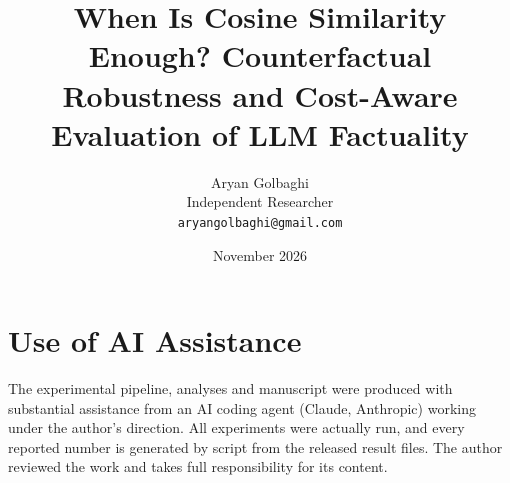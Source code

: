 \documentclass[11pt]{article}
\title{When Is Cosine Similarity Enough? Counterfactual Robustness and Cost-Aware Evaluation of LLM Factuality}
\author{Aryan Golbaghi \\
  Independent Researcher \\
  \texttt{aryangolbaghi@gmail.com}}
\date{November 2026}
\begin{document}
\maketitle









\section*{Use of AI Assistance}
The experimental pipeline, analyses and manuscript were produced with substantial assistance from an AI coding agent (Claude, Anthropic) working under the author's direction. All experiments were actually run, and every reported number is generated by script from the released result files. The author reviewed the work and takes full responsibility for its content.



\appendix

\end{document}

